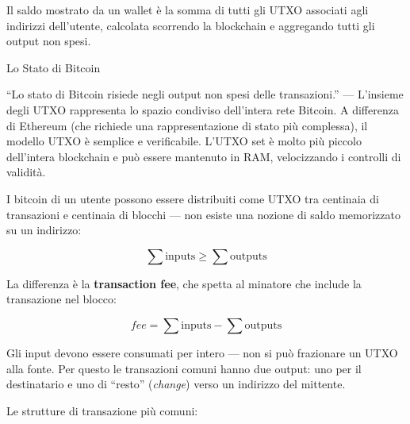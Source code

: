 \documentclass[
  italian,
  openany]{book}
\begin{document}
Il saldo mostrato da un wallet è la somma di tutti gli UTXO associati
agli indirizzi dell'utente, calcolata scorrendo la blockchain e
aggregando tutti gli output non spesi.

\begin{callouttip}{Lo Stato di Bitcoin}

``Lo stato di Bitcoin risiede negli output non spesi delle
transazioni.'' --- L'insieme degli UTXO rappresenta lo spazio condiviso
dell'intera rete Bitcoin. A differenza di Ethereum (che richiede una
rappresentazione di stato più complessa), il modello UTXO è semplice e
verificabile. L'UTXO set è molto più piccolo dell'intera blockchain e
può essere mantenuto in RAM, velocizzando i controlli di validità.

\end{callouttip}

I bitcoin di un utente possono essere distribuiti come UTXO tra
centinaia di transazioni e centinaia di blocchi --- non esiste una
nozione di saldo memorizzato su un indirizzo:

\[\sum \text{inputs} \geq \sum \text{outputs}\]

La differenza è la \textbf{transaction fee}, che spetta al minatore che
include la transazione nel blocco:

\[fee = \sum \text{inputs} - \sum \text{outputs}\]

Gli input devono essere consumati per intero --- non si può frazionare
un UTXO alla fonte. Per questo le transazioni comuni hanno due output:
uno per il destinatario e uno di ``resto'' (\emph{change}) verso un
indirizzo del mittente.

Le strutture di transazione più comuni:
\end{document}
